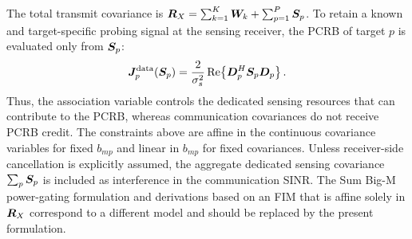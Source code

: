 The total transmit covariance is $\bm{R}_X=\sum_{k=1}^{K}\bm{W}_k+\sum_{p=1}^{P}\bm{S}_p$. To retain a known and target-specific probing signal at the sensing receiver, the PCRB of target $p$ is evaluated only from $\bm{S}_p$:
\begin{equation}\label{eq:clustered-fim}
 \bm{J}_p^{\mathrm{data}}(\bm{S}_p)
 =\frac{2}{\sigma_s^2}\operatorname{Re}\!\left\{\bm{D}_{p}^{H}\bm{S}_p\bm{D}_{p}\right\}.
\end{equation}
Thus, the association variable controls the dedicated sensing resources that can contribute to the PCRB, whereas communication covariances do not receive PCRB credit. The constraints above are affine in the continuous covariance variables for fixed $b_{mp}$ and linear in $b_{mp}$ for fixed covariances. Unless receiver-side cancellation is explicitly assumed, the aggregate dedicated sensing covariance $\sum_p\bm{S}_p$ is included as interference in the communication SINR. The Sum Big-M power-gating formulation and derivations based on an FIM that is affine solely in $\bm{R}_X$ correspond to a different model and should be replaced by the present formulation.

